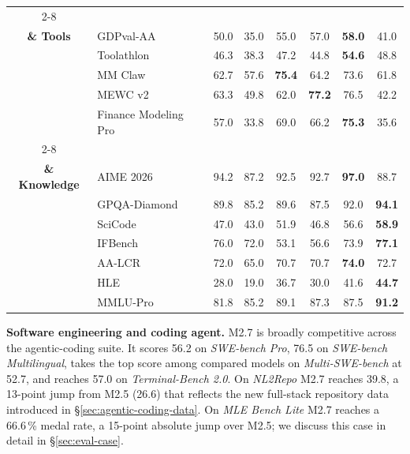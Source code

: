 \begin{table}[!t]
\begin{tabular}{c|l|cc|cccc}
\cmidrule(lr){2-8}
\multirow{5}{*}{\rotatebox[origin=c]{90}{\shortstack{\textbf{Office} \\ \textbf{\& Tools}}}}
 & GDPval-AA              & 50.0 & 35.0 & 55.0 & 57.0 & \textbf{58.0} & 41.0 \\
 & Toolathlon             & 46.3 & 38.3 & 47.2 & 44.8 & \textbf{54.6} & 48.8 \\
 & MM Claw                & 62.7 & 57.6 & \textbf{75.4} & 64.2 & 73.6 & 61.8 \\
 & MEWC v2                & 63.3 & 49.8 & 62.0 & \textbf{77.2} & 76.5 & 42.2 \\
 & Finance Modeling Pro   & 57.0 & 33.8 & 69.0 & 66.2 & \textbf{75.3} & 35.6 \\
\cmidrule(lr){2-8}
\multirow{7}{*}{\rotatebox[origin=c]{90}{\shortstack{\textbf{Reasoning} \\ \textbf{\& Knowledge}}}}
 & AIME 2026              & 94.2 & 87.2 & 92.5 & 92.7 & \textbf{97.0} & 88.7 \\
 & GPQA-Diamond           & 89.8 & 85.2 & 89.6 & 87.5 & 92.0 & \textbf{94.1} \\
 & SciCode                & 47.0 & 43.0 & 51.9 & 46.8 & 56.6 & \textbf{58.9} \\
 & IFBench                & 76.0 & 72.0 & 53.1 & 56.6 & 73.9 & \textbf{77.1} \\
 & AA-LCR                 & 72.0 & 65.0 & 70.7 & 70.7 & \textbf{74.0} & 72.7 \\
 & HLE                    & 28.0 & 19.0 & 36.7 & 30.0 & 41.6 & \textbf{44.7} \\
 & MMLU-Pro               & 81.8 & 85.2 & 89.1 & 87.3 & 87.5 & \textbf{91.2} \\
\bottomrule
\end{tabular}
\label{tab:m2-main-results}
\end{table}

\noindent \textbf{Software engineering and coding agent.} M2.7 is broadly competitive across the agentic-coding suite. It scores 56.2 on \emph{SWE-bench Pro}, 76.5 on \emph{SWE-bench Multilingual}, takes the top score among compared models on \emph{Multi-SWE-bench} at 52.7, and reaches 57.0 on \emph{Terminal-Bench 2.0}. On \emph{NL2Repo} M2.7 reaches 39.8, a 13-point jump from M2.5 (26.6) that reflects the new full-stack repository data introduced in \S\ref{sec:agentic-coding-data}. On \emph{MLE Bench Lite} M2.7 reaches a 66.6\,\% medal rate, a 15-point absolute jump over M2.5; we discuss this case in detail in \S\ref{sec:eval-case}.

